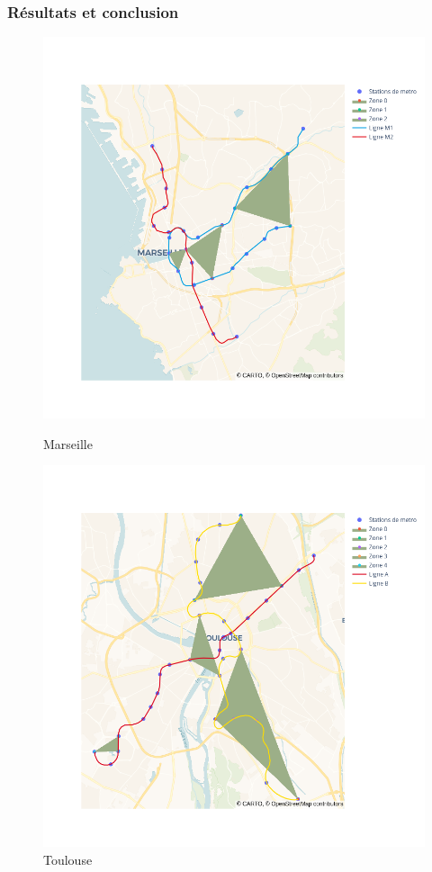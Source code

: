 \documentclass{beamer}
\begin{document}
\begin{frame}
    \frametitle{Résultats et conclusion}

    \begin{figure}[h]
        \begin{minipage}[c]{.42\linewidth}
            \centering
            \includegraphics[width=1.1\textwidth]{../../Code/images/marseille.png}
            \caption{Marseille}
        \end{minipage}
        \hfill
        \begin{minipage}[c]{.42\linewidth}
            \centering
            \includegraphics[width=1\textwidth]{../../Code/images/toulouse.png}
            \caption{Toulouse}
        \end{minipage}
    \end{figure}
\end{frame}
\end{document}
